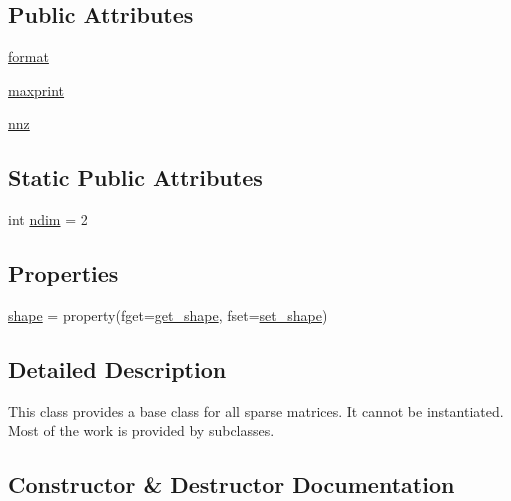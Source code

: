 \subsection*{Public Attributes}
\begin{DoxyCompactItemize}
\item 
\hyperlink{classscipy_1_1sparse_1_1base_1_1spmatrix_a0b4c13efc32d37d52d319e67fd2d0766}{format}
\item 
\hyperlink{classscipy_1_1sparse_1_1base_1_1spmatrix_ad59cd06fddff8cfafc6bf713cdce0edc}{maxprint}
\item 
\hyperlink{classscipy_1_1sparse_1_1base_1_1spmatrix_afbc6892aa4ef2a2f153b8cd89ee3036b}{nnz}
\end{DoxyCompactItemize}
\subsection*{Static Public Attributes}
\begin{DoxyCompactItemize}
\item 
int \hyperlink{classscipy_1_1sparse_1_1base_1_1spmatrix_aa8194f17b42cca3fad478bcab7a47f41}{ndim} = 2
\end{DoxyCompactItemize}
\subsection*{Properties}
\begin{DoxyCompactItemize}
\item 
\hyperlink{classscipy_1_1sparse_1_1base_1_1spmatrix_ade686c26cbca7e0ef89fe3be9c88d240}{shape} = property(fget=\hyperlink{classscipy_1_1sparse_1_1base_1_1spmatrix_af997a3ba2bc4ea75684e7c1d35b5f38c}{get\+\_\+shape}, fset=\hyperlink{classscipy_1_1sparse_1_1base_1_1spmatrix_a03816f51d9e91beff4dbf94513633f03}{set\+\_\+shape})
\end{DoxyCompactItemize}


\subsection{Detailed Description}
\begin{DoxyVerb}This class provides a base class for all sparse matrices.  It
cannot be instantiated.  Most of the work is provided by subclasses.
\end{DoxyVerb}
 

\subsection{Constructor \& Destructor Documentation}
\hypertarget{classscipy_1_1sparse_1_1base_1_1spmatrix_a10682329413058faa2f58e4ad34b4469}{}
